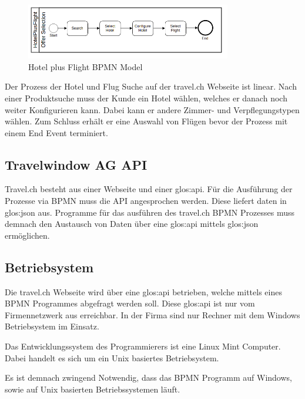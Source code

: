 \begin{figure}[H]
	\centering
	\includegraphics[width=0.8\textwidth]{images/hotelplusflight.png}
	\caption{Hotel plus Flight BPMN Model}
	\label{fig:recherche:rahmenbedingungen:hotelplusflight}
\end{figure}
Der Prozess der Hotel und Flug Suche auf der travel.ch Webseite ist linear. Nach einer Produktsuche muss der Kunde ein Hotel wählen, welches er danach noch weiter Konfigurieren kann. Dabei kann er andere Zimmer- und Verpflegungstypen wählen. Zum Schluss erhält er eine Auswahl von Flügen bevor der Prozess mit einem End Event terminiert.

\subsection{Travelwindow AG API}
\label{sec:Recherche:rahmenbedingungen:api}
Travel.ch besteht aus einer Webseite und einer \Gls{glos:api}. Für die Ausführung der Prozesse via BPMN muss die API angesprochen werden. Diese liefert daten in \Gls{glos:json} aus. Programme für das ausführen des travel.ch BPMN Prozesses muss demnach den Austausch von Daten über eine \Gls{glos:api} mittels \Gls{glos:json} ermöglichen.

\subsection{Betriebsystem}
Die travel.ch Webseite wird über eine \Gls{glos:api} betrieben, welche mittels eines BPMN Programmes abgefragt werden soll. Diese \Gls{glos:api} ist nur vom Firmennetzwerk aus erreichbar. In der Firma sind nur Rechner mit dem Windows Betriebsystem im Einsatz.

Das Entwicklungssystem des Programmierers ist eine Linux Mint Computer. Dabei handelt es sich um ein Unix basiertes Betriebsystem.

Es ist demnach zwingend Notwendig, dass das BPMN Programm auf Windows, sowie auf Unix basierten Betriebssystemen läuft.

